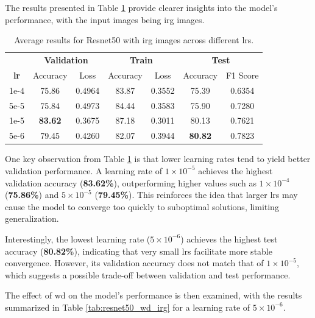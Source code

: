 The results presented in Table \ref{tab:resnet50_irg} provide clearer
insights into the model's performance, with the input images being \gls{irg} images.

\begin{table}[h]
    \centering
    \renewcommand{\arraystretch}{1.3}
    \setlength{\tabcolsep}{8pt}
    \begin{tabular}{|c|cccccc|}
        \hline
        & \multicolumn{2}{c}{\textbf{Validation}} & \multicolumn{2}{c}{\textbf{Train}} & \multicolumn{2}{c|}{\textbf{Test}} \\
        \textbf{\gls{lr}} & Accuracy & Loss & Accuracy & Loss & Accuracy & F1 Score \\
        \hline
        1e-4 & 75.86          & 0.4964 & 83.87 & 0.3552 & 75.39          & 0.6354 \\
        5e-5 & 75.84          & 0.4973 & 84.44 & 0.3583 & 75.90          & 0.7280 \\
        1e-5 & \textbf{83.62} & 0.3675 & 87.18 & 0.3011 & 80.13          & 0.7621 \\
        5e-6 & 79.45          & 0.4260 & 82.07 & 0.3944 & \textbf{80.82} & 0.7823 \\
        \hline
    \end{tabular}
    \caption{Average results for Resnet50 with \gls{irg} images across different \glspl{lr}.}
    \label{tab:resnet50_irg}
\end{table}

One key observation from Table \ref{tab:resnet50_irg} is that lower learning 
rates tend to yield better validation performance. A learning rate of 
$1\times10^{-5}$ achieves the highest validation accuracy (\textbf{83.62\%}), outperforming 
higher values such as $1\times10^{-4}$ (\textbf{75.86\%}) and $5\times10^{-5}$ (\textbf{79.45\%}). 
This reinforces the idea that larger \glspl{lr} may cause the model to converge too quickly to 
suboptimal solutions, limiting generalization.

Interestingly, the lowest learning rate ($5\times10^{-6}$) achieves the highest test 
accuracy (\textbf{80.82\%}), indicating that very small \glspl{lr} facilitate 
more stable convergence. However, its validation accuracy does not match that of 
$1\times10^{-5}$, which suggests a possible trade-off between validation and test performance.

The effect of \gls{wd} on the model's performance is then examined, with the
results summarized in Table \ref{tab:resnet50_wd_irg} for a learning rate of $5\times10^{-6}$.

